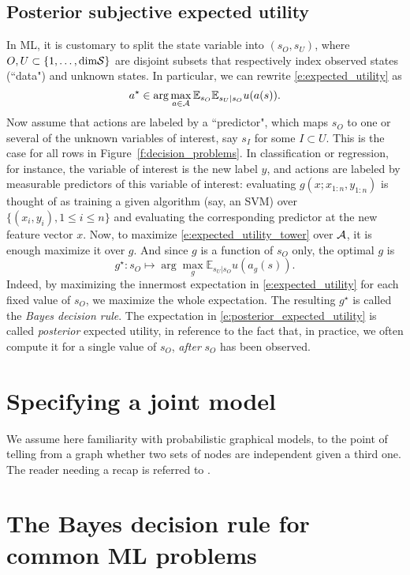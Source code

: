 \subsection{Posterior subjective expected utility}
In ML, it is customary to split the state variable into $(s_O,s_U)$, where $O, U\subset \{1,\dots,\text{dim} \mathcal{S}\}$ are disjoint subsets that respectively index observed states (``data") and unknown states. 
In particular, we can rewrite \eqref{e:expected_utility} as
\begin{equation}
    a^\star \in \arg\max_{a\in\mathcal{A}} \mathbb{E}_{s_O} \mathbb{E}_{s_U\vert s_O} u(a(s)).
    \label{e:expected_utility_tower}
\end{equation}
Now assume that actions are labeled by a ``predictor", which maps $s_O$ to one or several of the unknown variables of interest, say $s_I$ for some $I\subset U$. 
This is the case for all rows in Figure~\ref{f:decision_problems}. 
In classification or regression, for instance, the variable of interest is the new label $y$, and actions are labeled by measurable predictors of this variable of interest: evaluating $g(x; x_{1:n}, y_{1:n})$ is thought of as training a given algorithm (say, an SVM) over $\{(x_i,y_i), 1\leq i\leq n\}$ and evaluating the corresponding predictor at the new feature vector $x$.
Now, to maximize \eqref{e:expected_utility_tower} over $\mathcal{A}$, it is enough maximize it over $g$. 
And since $g$ is a function of $s_O$ only, the optimal $g$ is 
\begin{equation}
    \label{e:posterior_expected_utility}
    g^\star: s_O \mapsto \arg\max_{g} \mathbb{E}_{s_U\vert s_O} u(a_g(s)).
\end{equation}
Indeed, by maximizing the innermost expectation in \eqref{e:expected_utility} for each fixed value of $s_O$, we maximize the whole expectation. 
The resulting $g^\star$ is called the \emph{Bayes decision rule}. 
The expectation in \eqref{e:posterior_expected_utility} is called \emph{posterior} expected utility, in reference to the fact that, in practice, we often compute it for a single value of $s_O$, \emph{after} $s_O$ has been observed. 

\section{Specifying a joint model}
We assume here familiarity with probabilistic graphical models, to the point of telling from a graph whether two sets of nodes are independent given a third one. 
The reader needing a recap is referred to \citep[Sections 10.1 to 10.5]{Mur12}.

\section{The Bayes decision rule for common ML problems}